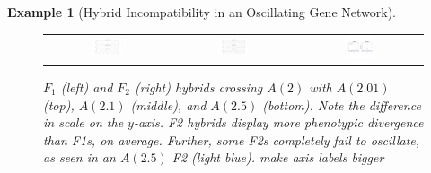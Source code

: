 \documentclass{article}
\newcommand{\plr}[1]{\todo[color=blue!25]{#1}}
\newcommand{\plri}[1]{{\color{blue}\it #1}}
\newcommand{\plr}[1]{{\color{blue}\it #1}}
\newcommand{\plri}[1]{\plr{#1}}
\newcommand{\1}{\mathbbm{1}}
\newtheorem{example}{Example}
\begin{document}
\begin{example}[Hybrid Incompatibility in an Oscillating Gene Network]


\begin{figure}[H]
  \centering
  \begin{tabular}{ccc}
    \includegraphics[width=0.25\textwidth, height=0.125\paperheight]{F1_comparison} & 
    \includegraphics[width=0.25\textwidth, height=0.125\paperheight]{F2s_comparison2} &
    \includegraphics[width=0.25\textwidth, height=0.125\paperheight]{figures/quartic_quadratic2}
  \end{tabular}
  \caption{
    $F_1$ (left) and $F_2$ (right) hybrids crossing $A(2)$ with $A(2.01)$ (top), $A(2.1)$ (middle), and $A(2.5)$ (bottom).
    Note the difference in scale on the $y$-axis. F2 hybrids display more phenotypic divergence than F1s, on average. Further, some F2s completely fail to oscillate, as seen in an $A(2.5)$ F2 (light blue).
    \plri{make axis labels bigger}
  }
\end{figure}
\end{example}
%
\end{document}
